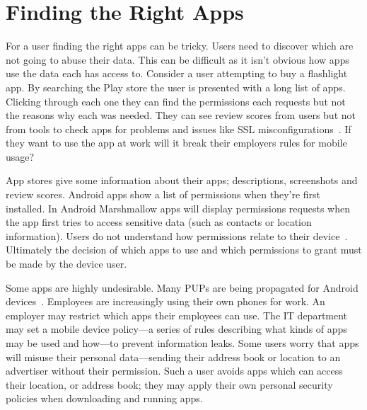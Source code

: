 \documentclass[thesis.tex]{subfiles}
\begin{document}

\section{Finding the Right Apps}

For a user finding the right apps can be tricky.
Users need to discover which are not going to abuse their data.
This can be difficult as it isn't obvious how apps use the data each has access to.
Consider a user attempting to buy a flashlight app.
By searching the Play store the user is presented with a long list of apps.
Clicking through each one they can find the permissions each requests but not the reasons why each was needed.
They can see review scores from users but not from tools to check apps for problems and issues like SSL misconfigurations~\cite{fahl_why_2012}.
If they want to use the app at work will it break their employers rules for mobile usage?

App stores give some information about their apps; descriptions, screenshots and review scores.
Android apps show a list of permissions when they're first installed.
In Android Marshmallow apps will display permissions requests when the app first tries to access sensitive data (such as contacts or location information).
Users do not understand how permissions relate to their device~\cite{felt_android_2012,thompson_when_2013}.
Ultimately the decision of which apps to use and which permissions to grant must be made by the device user.

Some apps are highly undesirable.
Many \acp{PUP} are being propagated for Android devices~\cite{truong_company_2014,vanja_svajcer_classifying_2013}.
Employees are increasingly using their own phones for work.
An employer may restrict which apps their employees can use.
The IT department may set a mobile device policy---a series of rules describing what kinds of apps may be used and how---to prevent information leaks.
Some users worry that apps will misuse their personal data---sending their address book or location to an advertiser without their permission.
Such a user avoids apps which can access their location, or address book; they may apply their own personal security policies when downloading and running apps.
\end{document}
